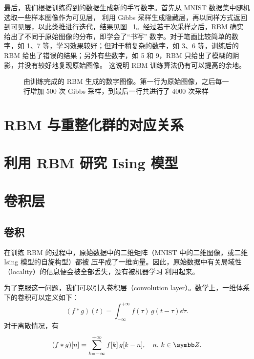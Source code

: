 最后，我们根据训练得到的数据生成新的手写数字。首先从 MNIST 数据集中随机选取一些样本图像作为可见层，
利用 Gibbs 采样生成隐藏层，再以同样方式返回到可见层，以此类推进行迭代，结果见图~%
\ref{fig:mnist-samples}。经过若干次采样之后，RBM 确实给出了不同于原始图像的分布，即学会了“书写”
数字。对于笔画比较简单的数字，如 1、7 等，学习效果较好；但对于稍复杂的数字，如 3、6 等，训练后的
RBM 给出了错误的结果；另外有些数字，如 5 和 9，RBM 只给出了模糊的阴影，并没有较好地复现原始图像。
这说明 RBM 训练算法仍有可以提高的余地。

\begin{figure}[htb]
  \centering
  \caption{由训练完成的 RBM 生成的数字图像。第一行为原始图像，之后每一行增加 \num{500} 次 Gibbs 采样，到最后一行共进行了 \num{4000} 次采样}
  \label{fig:mnist-samples}
\end{figure}

\section{RBM 与重整化群的对应关系}

\section{利用 RBM 研究 Ising 模型}

\section{卷积层}

\subsection{卷积}

在训练 RBM 的过程中，原始数据中的二维矩阵（MNIST 中的二维图像，或二维 Ising 模型的自旋构型）都被
压平成了一维向量。因此，原始数据中有关局域性（locality）的信息便会被全部丢失，没有被机器学习
利用起来。

为了克服这一问题，我们可以引入卷积层（convolution layer）。数学上，一维体系下的卷积可以定义如下：
\begin{equation}
  (f \ast g) (t) = \int_{-\infty}^{+\infty} f(\tau) \, g(t-\tau) \dd{\tau}.
\end{equation}
对于离散情况，有
\begin{equation}
  (f \ast g) [n] = \sum_{k=-\infty}^{+\infty} f[k] \, g[k-n] \qc n,\,k \in \Z.
\end{equation}

